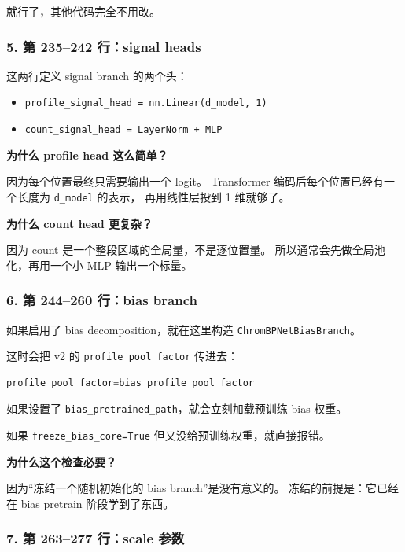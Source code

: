 \documentclass[11pt,a4paper]{ctexart}
\begin{document}
就行了，其他代码完全不用改。

\subsubsection*{5. 第 235--242 行：signal heads}

这两行定义 signal branch 的两个头：

\begin{itemize}[leftmargin=2em]
\item \texttt{profile\_signal\_head = nn.Linear(d\_model, 1)}
\item \texttt{count\_signal\_head = LayerNorm + MLP}
\end{itemize}

\textbf{为什么 profile head 这么简单？}

因为每个位置最终只需要输出一个 logit。
Transformer 编码后每个位置已经有一个长度为 \texttt{d\_model} 的表示，
再用线性层投到 1 维就够了。

\textbf{为什么 count head 更复杂？}

因为 count 是一个整段区域的全局量，不是逐位置量。
所以通常会先做全局池化，再用一个小 MLP 输出一个标量。

\subsubsection*{6. 第 244--260 行：bias branch}

如果启用了 bias decomposition，就在这里构造
\texttt{ChromBPNetBiasBranch}。

这时会把 v2 的 \texttt{profile\_pool\_factor} 传进去：

\begin{lstlisting}[language=Python]
profile_pool_factor=bias_profile_pool_factor
\end{lstlisting}

如果设置了 \texttt{bias\_pretrained\_path}，就会立刻加载预训练 bias 权重。

如果 \texttt{freeze\_bias\_core=True} 但又没给预训练权重，就直接报错。

\textbf{为什么这个检查必要？}

因为“冻结一个随机初始化的 bias branch”是没有意义的。
冻结的前提是：它已经在 bias pretrain 阶段学到了东西。

\subsubsection*{7. 第 263--277 行：scale 参数}
\end{document}
